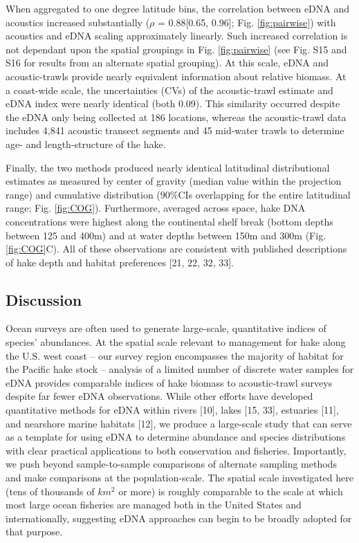 \documentclass[
]{article}
\begin{document}
When aggregated to one degree latitude bins, the correlation between
eDNA and acoustics increased substantially (\(\rho\) = 0.88{[}0.65,
0.96{]}; Fig. \ref{fig:pairwise}) with acoustics and eDNA scaling
approximately linearly. Such increased correlation is not dependant upon
the spatial groupings in Fig. \ref{fig:pairwise} (see Fig. S15 and
S16 for results from an alternate spatial grouping). At this scale, eDNA
and acoustic-trawls provide nearly equivalent information about relative
biomass. At a coast-wide scale, the uncertainties (CVs) of the
acoustic-trawl estimate and eDNA index were nearly identical (both 0.09). 
This similarity occurred despite the eDNA only
being collected at 186 locations, whereas the acoustic-trawl data
includes 4,841 acoustic transect segments and 45 mid-water trawls to
determine age- and length-structure of the hake.

Finally, the two methods produced nearly identical latitudinal
distributional estimates as measured by center of gravity (median value
within the projection range) and cumulative distribution (\(90\%\)CIs
overlapping for the entire latitudinal range; Fig. \ref{fig:COG}).
Furthermore, averaged across space, hake DNA concentrations were highest
along the continental shelf break (bottom depths between 125 and 400m)
and at water depths between 150m and 300m (Fig. \ref{fig:COG}C). All of
these observations are consistent with published descriptions of hake
depth and habitat preferences {[}21, 22, 32, 33{]}.

\hypertarget{discussion}{%
\subsection{Discussion}\label{discussion}}

Ocean surveys are often used to generate large-scale, quantitative
indices of species' abundances. At the spatial scale relevant to
management for hake along the U.S. west coast -- our survey region
encompasses the majority of habitat for the Pacific hake stock --
analysis of a limited number of discrete water samples for eDNA provides
comparable indices of hake biomass to acoustic-trawl surveys despite far
fewer eDNA observations. While other efforts have developed quantitative
methods for eDNA within rivers {[}10{]}, lakes {[}15, 33{]}, estuaries {[}11{]}, and
nearshore marine habitats {[}12{]}, we produce a large-scale study
that can serve as a template for using eDNA to determine abundance and species
distributions with clear practical applications to both conservation and
fisheries. Importantly, we push beyond sample-to-sample comparisons of
alternate sampling methods and make comparisons at the population-scale.
The spatial scale investigated here (tens of thousands of \(km^2\) or
more) is roughly comparable to the scale at which most large ocean
fisheries are managed both in the United States and internationally,
suggesting eDNA approaches can begin to be broadly adopted for that
purpose.
\end{document}
